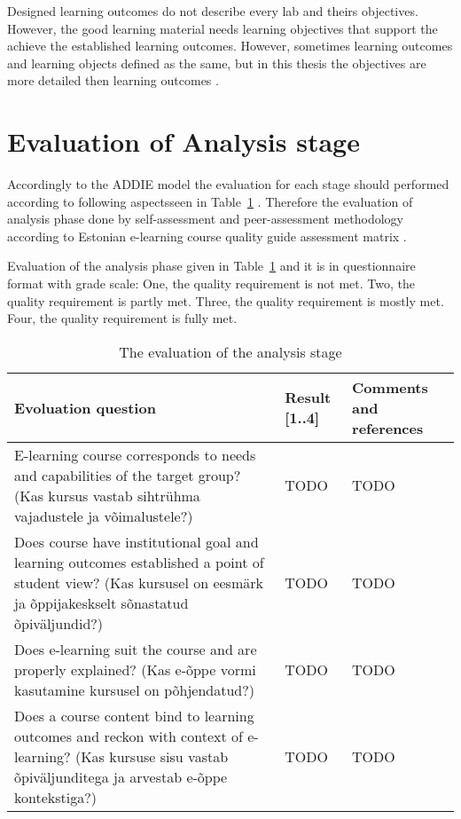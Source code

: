 Designed learning outcomes do not describe every lab and theirs objectives. However, the good learning material needs learning objectives that support the achieve the established learning outcomes. However, sometimes learning outcomes and learning objects defined as the same, but in this thesis the objectives are more detailed then learning outcomes \citep{website:objective_vs_outcome}.

\section{Evaluation of Analysis stage}

Accordingly to the \gls{ADDIE} model the evaluation for each stage should performed according to following aspectsseen in Table~\ref{tab:evoluation_analysis} \citep[p.~11]{OppeArenduskeskus2010}. Therefore the evaluation of analysis phase done by self-assessment and peer-assessment methodology according to Estonian e-learning course quality guide assessment matrix \citep{website:quality_mx}.

Evaluation of the analysis phase given in Table~\ref{tab:evoluation_analysis} and it is in questionnaire format with grade scale: One, the quality requirement is not met. Two, the quality requirement is partly met. Three, the quality requirement is mostly met. Four, the quality requirement is fully met.

\begin{table}[h]
\centering
\caption{The evaluation of the analysis stage }
\begin{tabular}{|p{6cm}|p{2cm}|p{5cm}|}
\hline 
\color{blue} Evoluation question & \color{blue} Result [1..4] & \color{blue} Comments and references \\ 
\hline
E-learning course corresponds to needs and capabilities of the target group? 
(Kas kursus vastab sihtrühma vajadustele ja võimalustele?) & TODO & TODO \\ 
\hline 
Does course have institutional goal and learning outcomes established a point of student view?
(Kas kursusel on eesmärk ja õppijakeskselt sõnastatud õpiväljundid?) & TODO & TODO \\ 
\hline 
Does e-learning suit the course and are properly explained?
(Kas e-õppe vormi kasutamine kursusel on põhjendatud?) & TODO & TODO \\ 
\hline
Does a course content bind to learning outcomes and reckon with context of e-learning?
(Kas kursuse sisu vastab õpiväljunditega ja arvestab e-õppe kontekstiga?) & TODO & TODO \\ 
\hline 
\end{tabular} 
\label{tab:evoluation_analysis}
\end{table}

